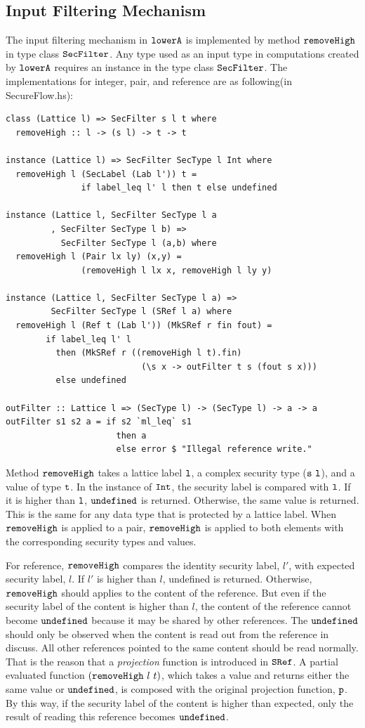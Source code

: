 \documentclass{report}
\newcommand{\co}[1]{$\cod{#1}$}
\begin{document}
\subsection{Input Filtering Mechanism}
\label{chap5:lowerA:ifm}
The input filtering mechanism in \co{lowerA} is implemented by 
method \co{removeHigh} in type class \co{SecFilter}. Any type used as an input type in computations created by
\co{lowerA} requires an instance in the type class \co{SecFilter}. The implementations for integer, pair,
and reference are as following(in SecureFlow.hs):
\begin{Verbatim}[fontsize=\small]
class (Lattice l) => SecFilter s l t where
  removeHigh :: l -> (s l) -> t -> t

instance (Lattice l) => SecFilter SecType l Int where
  removeHigh l (SecLabel (Lab l')) t = 
               if label_leq l' l then t else undefined

instance (Lattice l, SecFilter SecType l a
         , SecFilter SecType l b) =>
           SecFilter SecType l (a,b) where
  removeHigh l (Pair lx ly) (x,y) = 
               (removeHigh l lx x, removeHigh l ly y)

instance (Lattice l, SecFilter SecType l a) =>
         SecFilter SecType l (SRef l a) where
  removeHigh l (Ref t (Lab l')) (MkSRef r fin fout) =
        if label_leq l' l
          then (MkSRef r ((removeHigh l t).fin) 
                           (\s x -> outFilter t s (fout s x)))
          else undefined

outFilter :: Lattice l => (SecType l) -> (SecType l) -> a -> a
outFilter s1 s2 a = if s2 `ml_leq` s1
                      then a
                      else error $ "Illegal reference write." 
\end{Verbatim}
Method \co{removeHigh} takes a lattice label \co{l}, a complex security type (\co{s~l}), and a value of 
type \co{t}. In the instance of \co{Int}, the security label is compared with \co{l}. If it is higher 
than \co{l}, \co{undefined} is returned. Otherwise, the same value is returned. This is the same for any 
data type that is protected by a lattice label.
When \co{removeHigh} is applied to a pair, \co{removeHigh} is applied to both elements
with the corresponding security types and values.

For reference, \co{removeHigh} compares the identity security label, $l'$, with expected security label, $l$. 
If $l'$ is higher than $l$, undefined is returned. Otherwise, \co{removeHigh} should applies to the content
of the reference. But even if the security label of the content is higher than $l$, the content of the 
reference cannot become \co{undefined} because it may be shared by other references. The \co{undefined} should
only be observed when the content is read out from the reference in discuss. All other references pointed to
the same content should be read normally. That is the reason that a {\em projection}
function is introduced in \co{SRef}. A partial evaluated function $(\mathtt{removeHigh}~l~t)$, which takes
a value and returns either the same value or \co{undefined}, is composed with the original projection function,
\co{p}. By this way, if the security label of the content is higher than expected, only the result of reading this
reference becomes \co{undefined}. 
\end{document}

